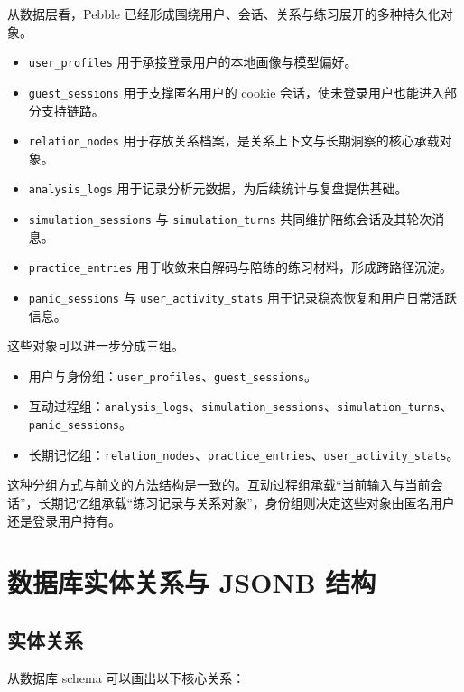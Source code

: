 从数据层看，Pebble 已经形成围绕用户、会话、关系与练习展开的多种持久化对象。

\begin{itemize}
  \item \texttt{user\_profiles} 用于承接登录用户的本地画像与模型偏好。
  \item \texttt{guest\_sessions} 用于支撑匿名用户的 cookie 会话，使未登录用户也能进入部分支持链路。
  \item \texttt{relation\_nodes} 用于存放关系档案，是关系上下文与长期洞察的核心承载对象。
  \item \texttt{analysis\_logs} 用于记录分析元数据，为后续统计与复盘提供基础。
  \item \texttt{simulation\_sessions} 与 \texttt{simulation\_turns} 共同维护陪练会话及其轮次消息。
  \item \texttt{practice\_entries} 用于收敛来自解码与陪练的练习材料，形成跨路径沉淀。
  \item \texttt{panic\_sessions} 与 \texttt{user\_activity\_stats} 用于记录稳态恢复和用户日常活跃信息。
\end{itemize}

这些对象可以进一步分成三组。

\begin{itemize}
  \item 用户与身份组：\texttt{user\_profiles}、\texttt{guest\_sessions}。
  \item 互动过程组：\texttt{analysis\_logs}、\texttt{simulation\_sessions}、\texttt{simulation\_turns}、\texttt{panic\_sessions}。
  \item 长期记忆组：\texttt{relation\_nodes}、\texttt{practice\_entries}、\texttt{user\_activity\_stats}。
\end{itemize}

这种分组方式与前文的方法结构是一致的。互动过程组承载“当前输入与当前会话”，长期记忆组承载“练习记录与关系对象”，身份组则决定这些对象由匿名用户还是登录用户持有。

\section{数据库实体关系与 JSONB 结构}


\subsection{实体关系}

从数据库 schema 可以画出以下核心关系：

